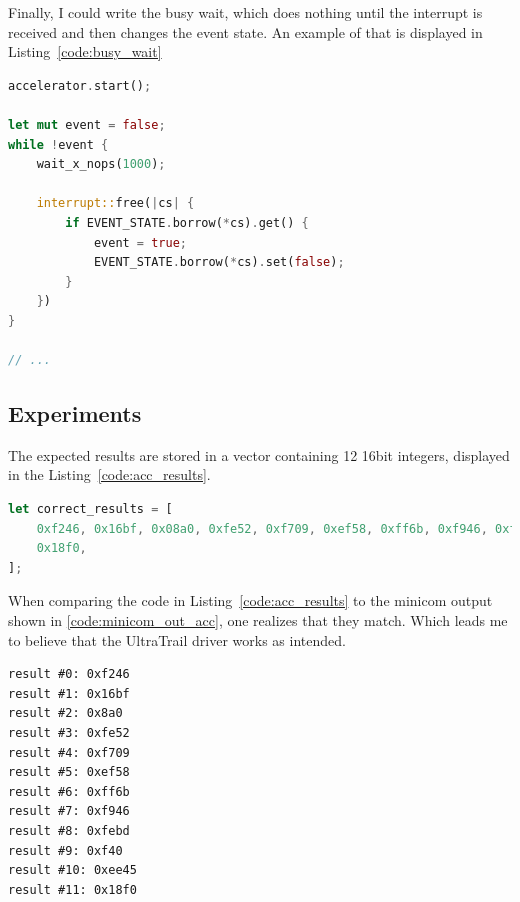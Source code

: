 Finally, I could write the busy wait, which does nothing until the interrupt is received
and then changes the event state.
An example of that is displayed in Listing~\ref{code:busy_wait}

\begin{minipage}{\textwidth}
\begin{lstlisting}[style=colorEX,language=Rust,caption={Snippet of the busy wait that waits for UltraTrail to finish},label={code:busy_wait}]
accelerator.start();

let mut event = false;
while !event {
    wait_x_nops(1000);

    interrupt::free(|cs| {
        if EVENT_STATE.borrow(*cs).get() {
            event = true;
            EVENT_STATE.borrow(*cs).set(false);
        }
    })
}

// ...
\end{lstlisting}
\end{minipage}

\subsection{Experiments}

The expected results are stored in a vector containing 12 16bit integers, displayed in the Listing~\ref{code:acc_results}.

\begin{minipage}{\textwidth}
\begin{lstlisting}[style=colorEX,language=Rust,caption={The expected results from the driver test},label={code:acc_results}]
let correct_results = [
    0xf246, 0x16bf, 0x08a0, 0xfe52, 0xf709, 0xef58, 0xff6b, 0xf946, 0xfebd, 0x0f40, 0xee45,
    0x18f0,
];
\end{lstlisting}
\end{minipage}

When comparing the code in Listing~\ref{code:acc_results} to the minicom output shown in \ref{code:minicom_out_acc},
one realizes that they match. Which leads me to believe that the UltraTrail driver works as intended.

\begin{minipage}{\textwidth}
\begin{lstlisting}[style=colorEx,caption={Minicom output after executing the driver test},label={code:minicom_out_acc}]
result #0: 0xf246
result #1: 0x16bf
result #2: 0x8a0
result #3: 0xfe52
result #4: 0xf709
result #5: 0xef58
result #6: 0xff6b
result #7: 0xf946
result #8: 0xfebd
result #9: 0xf40
result #10: 0xee45
result #11: 0x18f0
\end{lstlisting}
\end{minipage}
